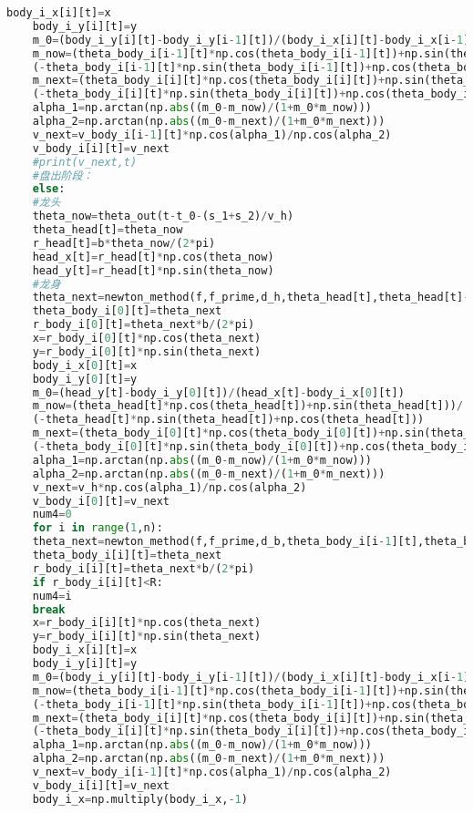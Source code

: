 \documentclass[withoutpreface,bwprint]{cumcmthesis} %
\begin{document}
\begin{lstlisting}[language=Python]
	body_i_x[i][t]=x
	body_i_y[i][t]=y
	m_0=(body_i_y[i][t]-body_i_y[i-1][t])/(body_i_x[i][t]-body_i_x[i-1][t])
	m_now=(theta_body_i[i-1][t]*np.cos(theta_body_i[i-1][t])+np.sin(theta_body_i[i-1][t]))/
	(-theta_body_i[i-1][t]*np.sin(theta_body_i[i-1][t])+np.cos(theta_body_i[i-1][t]))
	m_next=(theta_body_i[i][t]*np.cos(theta_body_i[i][t])+np.sin(theta_body_i[i][t]))/
	(-theta_body_i[i][t]*np.sin(theta_body_i[i][t])+np.cos(theta_body_i[i][t]))
	alpha_1=np.arctan(np.abs((m_0-m_now)/(1+m_0*m_now)))
	alpha_2=np.arctan(np.abs((m_0-m_next)/(1+m_0*m_next)))
	v_next=v_body_i[i-1][t]*np.cos(alpha_1)/np.cos(alpha_2)
	v_body_i[i][t]=v_next
	#print(v_next,t)
	#盘出阶段：
	else:
	#龙头
	theta_now=theta_out(t-t_0-(s_1+s_2)/v_h)
	theta_head[t]=theta_now
	r_head[t]=b*theta_now/(2*pi)
	head_x[t]=r_head[t]*np.cos(theta_now)
	head_y[t]=r_head[t]*np.sin(theta_now)
	#龙身
	theta_next=newton_method(f,f_prime,d_h,theta_head[t],theta_head[t]-pi/2)
	theta_body_i[0][t]=theta_next
	r_body_i[0][t]=theta_next*b/(2*pi)
	x=r_body_i[0][t]*np.cos(theta_next)
	y=r_body_i[0][t]*np.sin(theta_next)
	body_i_x[0][t]=x
	body_i_y[0][t]=y
	m_0=(head_y[t]-body_i_y[0][t])/(head_x[t]-body_i_x[0][t])
	m_now=(theta_head[t]*np.cos(theta_head[t])+np.sin(theta_head[t]))/
	(-theta_head[t]*np.sin(theta_head[t])+np.cos(theta_head[t]))
	m_next=(theta_body_i[0][t]*np.cos(theta_body_i[0][t])+np.sin(theta_body_i[0][t]))/
	(-theta_body_i[0][t]*np.sin(theta_body_i[0][t])+np.cos(theta_body_i[0][t]))
	alpha_1=np.arctan(np.abs((m_0-m_now)/(1+m_0*m_now)))
	alpha_2=np.arctan(np.abs((m_0-m_next)/(1+m_0*m_next)))
	v_next=v_h*np.cos(alpha_1)/np.cos(alpha_2)
	v_body_i[0][t]=v_next
	num4=0
	for i in range(1,n):
	theta_next=newton_method(f,f_prime,d_b,theta_body_i[i-1][t],theta_body_i[i-1][t]-pi/2)
	theta_body_i[i][t]=theta_next
	r_body_i[i][t]=theta_next*b/(2*pi)
	if r_body_i[i][t]<R:
	num4=i
	break
	x=r_body_i[i][t]*np.cos(theta_next)
	y=r_body_i[i][t]*np.sin(theta_next)
	body_i_x[i][t]=x
	body_i_y[i][t]=y
	m_0=(body_i_y[i][t]-body_i_y[i-1][t])/(body_i_x[i][t]-body_i_x[i-1][t])
	m_now=(theta_body_i[i-1][t]*np.cos(theta_body_i[i-1][t])+np.sin(theta_body_i[i-1][t]))/
	(-theta_body_i[i-1][t]*np.sin(theta_body_i[i-1][t])+np.cos(theta_body_i[i-1][t]))
	m_next=(theta_body_i[i][t]*np.cos(theta_body_i[i][t])+np.sin(theta_body_i[i][t]))/
	(-theta_body_i[i][t]*np.sin(theta_body_i[i][t])+np.cos(theta_body_i[i][t]))
	alpha_1=np.arctan(np.abs((m_0-m_now)/(1+m_0*m_now)))
	alpha_2=np.arctan(np.abs((m_0-m_next)/(1+m_0*m_next)))
	v_next=v_body_i[i-1][t]*np.cos(alpha_1)/np.cos(alpha_2)
	v_body_i[i][t]=v_next
	body_i_x=np.multiply(body_i_x,-1)

\end{lstlisting}
\end{document}
